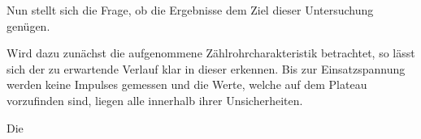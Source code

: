 	Nun stellt sich die Frage, ob die Ergebnisse dem Ziel dieser Untersuchung genügen.
	
	Wird dazu zunächst die aufgenommene Zählrohrcharakteristik betrachtet, so lässt sich der zu erwartende Verlauf klar in dieser erkennen.
	Bis zur Einsatzspannung werden keine Impulses gemessen und die Werte, welche auf dem Plateau vorzufinden sind, liegen alle innerhalb ihrer Unsicherheiten.
	
	Die 
	
	